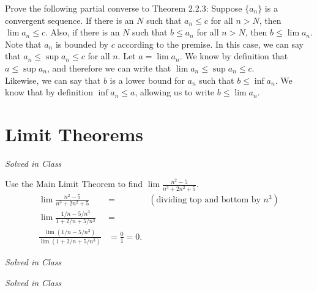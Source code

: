 \documentclass[12pt]{book}
\newenvironment{exercise}[2][Exercise]{\begin{trivlist}
\item[\hskip \labelsep {\bfseries #1}\hskip \labelsep {\bfseries #2.}]}{\end{trivlist}}
\begin{document}
\begin{exercise}{2.2.12}
Prove the following partial converse to Theorem 2.2.3: Suppose $\{a_n\}$ is a convergent sequence. If there is an $N$ such that $a_n \leq c$ for all $n > N$, then $\lim a_n \leq c$. Also, if there is an $N$ such that $b \leq a_n$ for all $n > N$, then $b \leq \lim a_n$. \\

Note that ${a_n}$ is bounded by $c$ according to the premise. In this case, we can say that $a_n \leq \sup a_n \leq c$ for all $n$. Let $ a = \lim a_n$. We know by definition that $a \leq \sup a_n$, and therefore we can write that $\lim a_n \leq \sup a_n \leq c$. \\
Likewise, we can say that $b$ is a lower bound for $a_n$ such that $b \leq \inf a_n$. We know that by definition $\inf a_n \leq a$, allowing us to write $b \leq \lim a_n$.
\end{exercise}


\section{Limit Theorems}

\begin{exercise}{2.3.1}
\emph{Solved in Class}
\end{exercise}


\begin{exercise}{2.3.2}
Use the Main Limit Theorem to find $\lim \frac{n^2 - 5}{n^3 + 2n^2 + 5}$. \\
	\begin{align*}
		\lim \frac{n^2 - 5}{n^3 + 2n^2 + 5} &=  &(\text{dividing top and bottom by $n^3$}) \\
		\lim \frac{1/n - 5/n^3}{1+2/n + 5/n^3} &= \\
		\frac{\lim (1/n - 5/n^3)}{\lim (1+2/n + 5/n^3)} &= \frac{0}{1} = 0.
	\end{align*}
\end{exercise}

\begin{exercise}{2.3.3}
\emph{Solved in Class}
\end{exercise}

\begin{exercise}{2.3.4}
\emph{Solved in Class}
\end{exercise}
\end{document}
